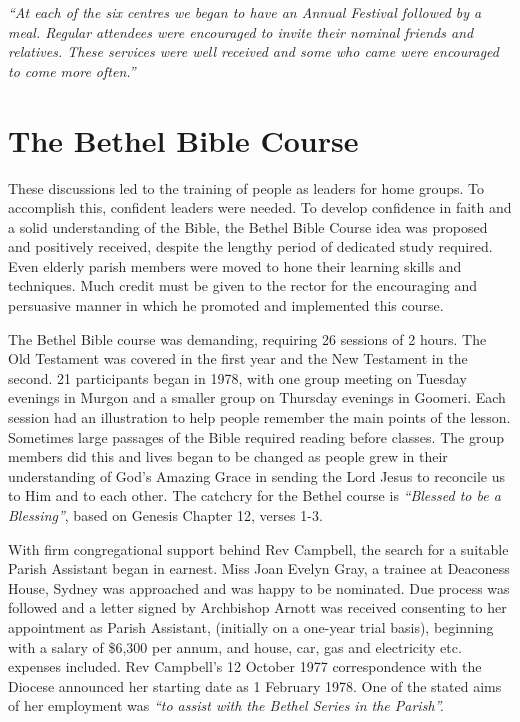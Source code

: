 \emph{``At each of the six centres we began to have an Annual Festival followed by a meal. Regular attendees were encouraged to invite their nominal friends and relatives. These services were well received and some who came were encouraged to come more often.''}



\section{The Bethel Bible Course}



These discussions led to the training of people as leaders for home groups. To accomplish this, confident leaders were needed. To develop confidence in faith and a solid understanding of the Bible, the Bethel Bible Course idea was proposed and positively received, despite the lengthy period of dedicated study required. Even elderly parish members were moved to hone their learning skills and techniques. Much credit must be given to the rector for the encouraging and persuasive manner in which he promoted and implemented this course.



The Bethel Bible course was demanding, requiring 26 sessions of 2  hours. The Old Testament was covered in the first year and the New Testament in the second. 21 participants began in 1978, with one group meeting on Tuesday evenings in Murgon and a smaller group on Thursday evenings in Goomeri. Each session had an illustration to help people remember the main points of the lesson. Sometimes large passages of the Bible required reading before classes. The group members did this and lives began to be changed as people grew in their understanding of God's Amazing Grace in sending the Lord Jesus to reconcile us to Him and to each other. The catchcry for the Bethel course is \emph{``Blessed to be a Blessing''}, based on Genesis Chapter 12, verses 1-3.



With firm congregational support behind Rev Campbell, the search for a suitable Parish Assistant began in earnest. Miss Joan Evelyn Gray, a trainee at Deaconess House, Sydney was approached and was happy to be nominated. Due process was followed and a letter signed by Archbishop Arnott was received consenting to her appointment as Parish Assistant, (initially on a one-year trial basis), beginning with a salary of \$6,300 per annum, and house, car, gas and electricity etc. expenses included. Rev Campbell's 12 October 1977 correspondence with the Diocese announced her starting date as 1 February 1978. One of the stated aims of her employment was \emph{``to assist with the Bethel Series in the Parish''.}









